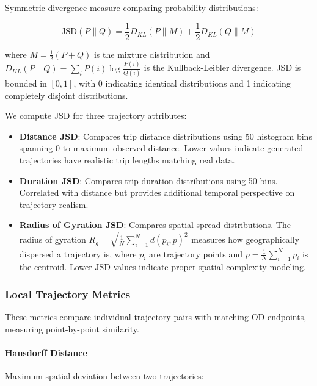Symmetric divergence measure comparing probability distributions:

\begin{equation}
\text{JSD}(P \parallel Q) = \frac{1}{2} D_{KL}(P \parallel M) + \frac{1}{2} D_{KL}(Q \parallel M)
\label{eq:jsd-appendix}
\end{equation}

where $M = \frac{1}{2}(P + Q)$ is the mixture distribution and $D_{KL}(P \parallel Q) = \sum_i P(i) \log \frac{P(i)}{Q(i)}$ is the Kullback-Leibler divergence. JSD is bounded in $[0, 1]$, with 0 indicating identical distributions and 1 indicating completely disjoint distributions.

We compute JSD for three trajectory attributes:

\begin{itemize}[noitemsep,topsep=0pt]
\item \textbf{Distance JSD}: Compares trip distance distributions using 50 histogram bins spanning 0 to maximum observed distance. Lower values indicate generated trajectories have realistic trip lengths matching real data.

\item \textbf{Duration JSD}: Compares trip duration distributions using 50 bins. Correlated with distance but provides additional temporal perspective on trajectory realism.

\item \textbf{Radius of Gyration JSD}: Compares spatial spread distributions. The radius of gyration $R_g = \sqrt{\frac{1}{N} \sum_{i=1}^{N} d(p_i, \bar{p})^2}$ measures how geographically dispersed a trajectory is, where $p_i$ are trajectory points and $\bar{p} = \frac{1}{N}\sum_{i=1}^N p_i$ is the centroid. Lower JSD values indicate proper spatial complexity modeling.
\end{itemize}

\subsubsection{Local Trajectory Metrics}
\label{app:local-metrics}

These metrics compare individual trajectory pairs with matching OD endpoints, measuring point-by-point similarity.

\paragraph{Hausdorff Distance}

Maximum spatial deviation between two trajectories:

